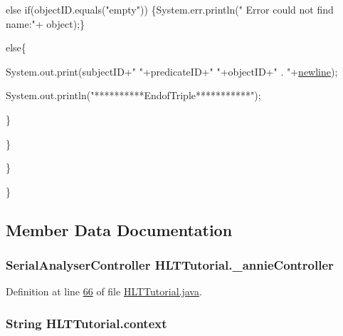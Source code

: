 \begin{DoxyCode}
                \textcolor{keywordflow}{else} \textcolor{keywordflow}{if}(objectID.equals(\textcolor{stringliteral}{"empty"}))
                \{System.err.println(\textcolor{stringliteral}{" Error could not find name:"}+ \textcolor{keywordtype}{object});\}

                \textcolor{keywordflow}{else}\{

                    System.out.print(subjectID+\textcolor{stringliteral}{" "}+predicateID+\textcolor{stringliteral}{" "}+objectID+\textcolor{stringliteral}{" .
      "}+\hyperlink{class_h_l_t_tutorial_adb4199589eaaf5b9598cc2b2f7590659}{newline});

                    System.out.println(\textcolor{stringliteral}{"**********EndofTriple***********"});

                \}   


            \}




        \}



        


    \}
\end{DoxyCode}


\subsection{Member Data Documentation}
\hypertarget{class_h_l_t_tutorial_ae3ecde0fc3f5486e117de53e615058ca}{
\subsubsection[{\-\_\-annie\-Controller}]{\setlength{\rightskip}{0pt plus 5cm}Serial\-Analyser\-Controller H\-L\-T\-Tutorial.\-\_\-annie\-Controller}}\label{class_h_l_t_tutorial_ae3ecde0fc3f5486e117de53e615058ca}


Definition at line \hyperlink{L66}{66} of file \hyperlink{}{H\-L\-T\-Tutorial.\-java}.

\hypertarget{class_h_l_t_tutorial_ae71fbcbcb26faf92a453dd4fad5a7a85}{
\subsubsection[{context}]{\setlength{\rightskip}{0pt plus 5cm}String H\-L\-T\-Tutorial.\-context}}\label{class_h_l_t_tutorial_ae71fbcbcb26faf92a453dd4fad5a7a85}


